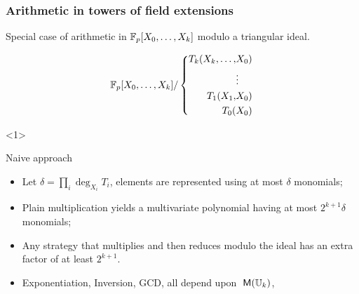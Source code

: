 \documentclass[10pt]{beamer}
\renewcommand{\emph}[1]{{\usebeamercolor[fg]{structure}#1}}
\begin{document}
\begin{frame}
  \frametitle{Arithmetic in towers of field extensions}
  
  Special case of arithmetic in $\mathbb{F}_p[X_0,\ldots,X_k]$ modulo a
  \emph{triangular ideal}.
  
  \begin{equation*}
    \mathbb{F}_p[X_0,\ldots,X_k] / \left\{
      \begin{aligned}
        T_k(X_k,\ldots, &X_0)\\
        &\vdots\\
        T_1(X_1, &X_0)\\
        T_0(&X_0)
      \end{aligned}
    \right.
  \end{equation*}

  \begin{overlayarea}{\textwidth}{0.5\textheight}
    \begin{onlyenv}<1>
      \begin{block}{Naive approach}
        \begin{itemize}
        \item Let $\delta=\prod_i\deg_{X_i}T_i$, elements are represented
          using at most $\delta$ monomials;
        \item Plain multiplication yields a multivariate polynomial having
          at most $2^{k+1}\delta$ monomials;
        \item \alert{Any strategy} that multiplies and then reduces modulo
          the ideal has an extra factor of at least \alert{$2^{k+1}$}.
        \item Exponentiation, Inversion, GCD, all depend upon $\;\mathsf{M}(\mathbb{U}_k)$,
        \end{itemize}
      \end{block}
    \end{onlyenv}
    

\end{overlayarea}
\end{frame}
\end{document}

